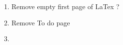 \begin{enumerate}
\item Remove empty first page of LaTex ?
\item Remove To do page
\item
\end{enumerate}